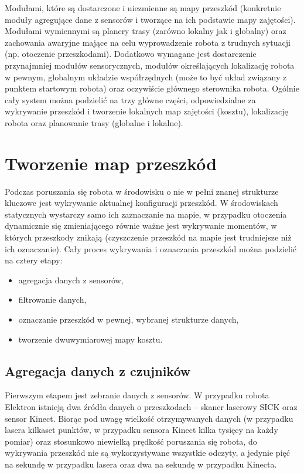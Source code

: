 Modułami, które są dostarczone i niezmienne są mapy przeszkód (konkretnie
moduły agregujące dane z sensorów i tworzące na ich podstawie mapy zajętości).
Modułami wymiennymi są planery trasy (zarówno lokalny jak i globalny) oraz
zachowania awaryjne mające na celu wyprowadzenie robota z trudnych sytuacji
(np. otoczenie przeszkodami). Dodatkowo wymagane jest dostarczenie przynajmniej
modułów sensorycznych, modułów określających lokalizację robota w pewnym,
globalnym układzie współrzędnych (może to być układ związany z punktem startowym
robota) oraz oczywiście głównego sterownika robota. Ogólnie cały system można
podzielić na trzy główne części, odpowiedzialne za wykrywanie przeszkód i
tworzenie lokalnych map zajętości (kosztu), lokalizację robota oraz planowanie
trasy (globalne i lokalne).

\section{Tworzenie map przeszkód}

Podczas poruszania się robota w środowisku o nie w pełni znanej strukturze
kluczowe jest wykrywanie aktualnej konfiguracji przeszkód. W środowiskach
statycznych wystarczy samo ich zaznaczanie na mapie, w przypadku otoczenia
dynamicznie się zmieniającego równie ważne jest wykrywanie momentów, w których
przeszkody znikają (czyszczenie przeszkód na mapie jest trudniejsze niż ich
oznaczanie). Cały proces wykrywania i oznaczania przeszkód można podzielić na
cztery etapy:

\begin{itemize}
  \item agregacja danych z sensorów,
  \item filtrowanie danych,
  \item oznaczanie przeszkód w pewnej, wybranej strukturze danych,
  \item tworzenie dwuwymiarowej mapy kosztu.
\end{itemize}

\subsection{Agregacja danych z czujników}

Pierwszym etapem jest zebranie danych z sensorów. W przypadku robota Elektron
istnieją dwa źródła danych o przeszkodach -- skaner laserowy SICK oraz sensor
Kinect. Biorąc pod uwagę wielkość otrzymywanych danych (w przypadku lasera
kilkaset punktów, w przypadku sensora Kinect kilka tysięcy na każdy pomiar) oraz
stosunkowo niewielką prędkość poruszania się robota, do wykrywania przeszkód
nie są wykorzystywane wszystkie odczyty, a jedynie pięć na sekundę w przypadku
lasera oraz dwa na sekundę w przypadku Kinecta.


